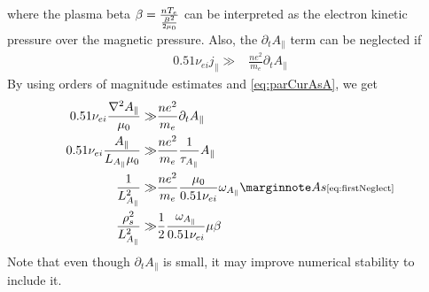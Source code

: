 %
where the plasma beta $\beta=\frac{nT_e}{\frac{B^2}{2\mu_0}}$ can be interpreted as the electron kinetic pressure over the magnetic pressure.
Also, the $\partial_t A_\|$ term can be neglected if
%
\begin{align*}
    0.51\nu_{ei}j_\|
    \gg &
    \frac{ne^2}{m_e}\partial_t A_\|
\end{align*}
%
By using orders of magnitude estimates and \cref{eq:parCurAsA}, we get
%
\begin{align*}
    0.51\nu_{ei}\frac{\grad^2 A_\|}{\mu_0}
    \gg &
    \frac{ne^2}{m_e}\partial_t A_\|
    \\
    0.51\nu_{ei}\frac{A_\|}{L_{A_\|}\mu_0}
    \gg &
    \frac{ne^2}{m_e}\frac{1}{\tau_{A_{\|}}} A_\|
    \\
    \frac{1}{L^2_{A_\|}}
    \gg &
    \frac{ne^2}{m_e}\frac{\mu_0}{0.51\nu_{ei}}\om_{A_{\|}}
    \note{As \cref{eq:firstNeglect}}
    \\
    \frac{\rho_s^2}{L^2_{A_\|}}
    \gg &
    \frac{1}{2}\frac{\om_{A_{\|}}}{0.51\nu_{ei}}\mu
    \b
\end{align*}
%
Note that even though $\partial_t A_\|$ is small, it may improve numerical stability to include it.
